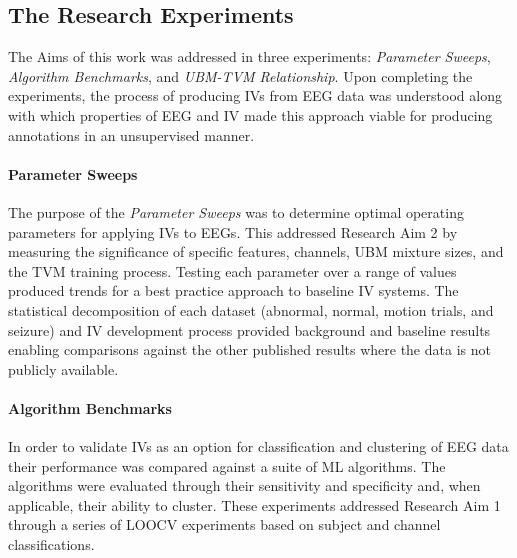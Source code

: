 
\subsection{The Research Experiments}

The Aims of this work was addressed in three experiments: \emph{Parameter Sweeps}, \emph{Algorithm Benchmarks}, and \emph{\ac{UBM}-\ac{TVM} Relationship}. Upon completing the experiments, the process of producing \acp{IV} from \ac{EEG} data was understood along with which properties of \ac{EEG} and \ac{IV} made this approach viable for producing annotations in an unsupervised manner.

\paragraph*{Parameter Sweeps}
The purpose of the \emph{Parameter Sweeps} was to determine optimal operating parameters for applying \acp{IV} to \acp{EEG}. This addressed Research Aim 2 by measuring the significance of specific features, channels, \ac{UBM} mixture sizes, and the \ac{TVM} training process. Testing each parameter over a range of values produced trends for a best practice approach to baseline \ac{IV} systems. The statistical decomposition of each dataset (abnormal, normal, motion trials, and seizure) and \ac{IV} development process provided background and baseline results enabling comparisons against the other published results where the data is not publicly available.

\paragraph*{Algorithm Benchmarks}
In order to validate \acp{IV} as an option for classification and clustering of \ac{EEG} data their performance was compared against a suite of \ac{ML} algorithms. The algorithms were evaluated through their sensitivity and specificity and, when applicable, their ability to cluster. These experiments addressed Research Aim 1 through a series of \ac{LOOCV} experiments based on subject and channel classifications.  

